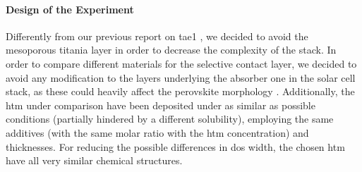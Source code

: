 	\begin{figure}
	\end{figure}

	\paragraph{Design of the Experiment}
	Differently from our previous report on \gls{tae1} \cite{Cabau2015a}, we decided to avoid the mesoporous titania layer in order to decrease the complexity of the stack.
	In order to compare different materials for the selective contact layer, we decided to avoid any modification to the layers underlying the absorber one in the solar cell stack, as these could heavily affect the perovskite morphology \cite{Tao2017,Bi2015}.
	Additionally, the \gls{htm} under comparison have been deposited under as similar as possible conditions (partially hindered by a different solubility), employing the same additives (with the same molar ratio with the \gls{htm} concentration) and thicknesses.
	For reducing the possible differences in \gls{dos} width, the chosen \gls{htm} have all very similar chemical structures.


